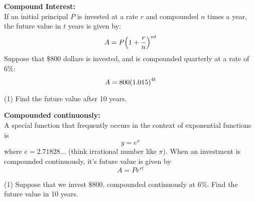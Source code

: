 \documentclass[../mathNotesPreamble]{subfiles}
\begin{document}
  \begin{ex*}
    \textbf{Compound Interest:}\\
    If an initial principal $P$ is invested at a rate $r$ and compounded $n$ times a year, the future value in $t$ years is given by:
      \[A=P{\left(1+\frac{r}{n}\right)}^{nt}\]
    Suppose that $\$800$ dollars is invested, and is compounded quarterly at a rate of $6\%$:
      \[A=800{\left(1.015\right)}^{4t}\]

  \end{ex*}
  \begin{extasks*}[after-item-skip=\stretch{1}](1)
    \task Find the future value after 10 years.
  \end{extasks*}
  \pagebreak

  \begin{ex*}
    \textbf{Compounded continuously:}\\
    A special function that frequently occurs in the context of exponential functions is
      \[y=e^x\]
    where $e= 2.71828...$ (think irrational number like $\pi$). When an investment is compounded continuously, it's future value is given by
      \[A=Pe^{rt}\]
  \end{ex*}
  \begin{extasks*}[after-item-skip=\stretch{1}](1)
    \task Suppose that we invest $\$800$, compounded continuously at $6\%$. Find the future value in 10 years.
  \end{extasks*}
  \pagebreak


  \pagebreak
\end{document}
